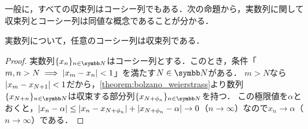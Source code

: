 \documentclass[../../main]{subfiles}
\begin{document}
一般に，すべての収束列はコーシー列でもある．次の命題から，実数列に関して収束列とコーシー列は同値な概念であることが分かる．

\begin{proposition}{}{}
  実数列について，任意のコーシー列は収束列である．
\end{proposition}

\begin{proof}
  実数列\(\seq{x_n}_{n\in\numset{N}}\)はコーシー列とする．このとき，条件「\(m,n>N\implies\lvert x_m-x_n\rvert<1\)」を満たす\(N\in\numset{N}\)がある．
  \(m>N\)なら\(\lvert x_m-x_{N+1}\rvert<1\)だから，\cref{theorem:bolzano_weierstrass}より数列\(\seq{x_{N+n}}_{n\in\numset{N}}\)は収束する部分列\(\seq{x_{N+\phi_n}}_{n\in\numset{N}}\)を持つ．
  この極限値を\(\alpha\)とおくと，\(\lvert x_n-\alpha\rvert\leq\lvert x_n-x_{N+\phi_n}\rvert+\lvert x_{N+\phi_n}-\alpha\rvert\to 0\)（\(n\to\infty\)）なので\(x_n\to\alpha\)（\(n\to\infty\)）である．
\end{proof}
\end{document}
